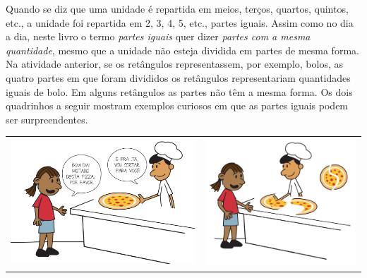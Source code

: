 \begin{refletindo*}[breakable]{}{}
  Quando se diz que uma unidade é repartida em meios, terços, quartos, quintos, etc., a unidade foi repartida em 2, 3, 4, 5, etc., partes iguais.
  Assim como no dia a dia, neste livro o termo   {\it partes iguais}   quer dizer   {\it partes com a mesma quantidade}, mesmo que a unidade não esteja dividida em partes de mesma forma.
  Na atividade anterior, se os retângulos representassem, por exemplo, bolos, as quatro partes em que foram divididos os retângulos representariam quantidades iguais de bolo.
  Em alguns retângulos as partes não têm a mesma forma.
  Os dois quadrinhos a seguir mostram exemplos curiosos em que as partes iguais podem ser surpreendentes.

  \noindent\begin{tabular}{ll}
    \includegraphics[width=220pt, keepaspectratio]{../figuras/licao01/reflet_fig01.png} & \includegraphics[width=180pt, keepaspectratio]{../figuras/licao01/reflet_fig02.png}

  \end{tabular}
\vspace{.5cm}
  \hline
  \vspace{.5cm}


\end{refletindo*}
